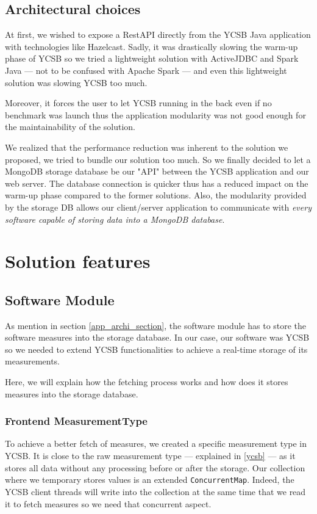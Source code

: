 \documentclass[a4paper,11pt]{report}
\begin{document}
\subsection{Architectural choices}

At first, we wished to expose a RestAPI directly from the YCSB Java application with technologies like Hazelcast. Sadly, it was drastically slowing the warm-up phase of YCSB so we tried a lightweight solution with ActiveJDBC and Spark Java --- not to be confused with Apache Spark --- and even this lightweight solution was slowing YCSB too much. 

Moreover, it forces the user to let YCSB running in the back even if no benchmark was launch thus the application modularity was not good enough for the maintainability of the solution. 

We realized that the performance reduction was inherent to the solution we proposed, we tried to bundle our solution too much. So we finally decided to let a MongoDB storage database be our "API" between the YCSB application and our web server. The database connection is quicker thus has a reduced impact on the warm-up phase compared to the former solutions. Also, the modularity provided by the storage DB allows our client/server application to communicate with \textit{every software capable of storing data into a MongoDB database}.

\section{Solution features}\label{technical_description}

\subsection{Software Module}

As mention in section \ref{app_archi_section}, the software module has to store the software measures into the storage database. In our case, our software was YCSB so we needed to extend YCSB functionalities to achieve a real-time storage of its measurements. 

Here, we will explain how the fetching process works and how does it stores measures into the storage database.

\subsubsection{Frontend MeasurementType} To achieve a better fetch of measures, we created a specific measurement type in YCSB. It is close to the raw measurement type --- explained in \ref{ycsb} --- as it stores all data without any processing before or after the storage. Our collection where we temporary stores values is an extended \texttt{ConcurrentMap}. Indeed, the YCSB client threads will write into the collection at the same time that we read it to fetch measures so we need that concurrent aspect.
\end{document}
